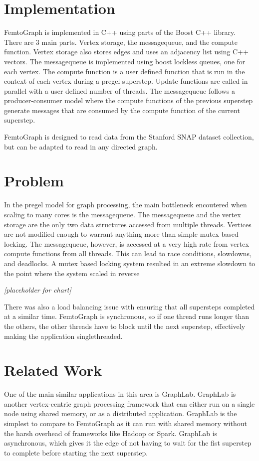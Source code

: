 \documentclass{sig-alternate-05-2015}
\begin{document}
\section{Implementation}
FemtoGraph is implemented in C++ using parts of the Boost C++ library. There are 3 main parts. Vertex storage, the messagequeue, and the compute function. Vertex storage also stores edges and uses  an adjacency list using C++ vectors. The messagequeue is implemented using boost lockless queues, one for each vertex. The compute function is a user defined function that is run in the context of each vertex during a pregel superstep. Update functions are called in parallel with a user defined number of threads. The messagequeue follows a producer-consumer model where the compute functions of the previous superstep generate messages that are consumed by the compute function of the current superstep.

FemtoGraph is designed to read data from the Stanford SNAP dataset collection, but can be adapted to read in any directed graph. 


\section{Problem}
In the pregel model for graph processing, the main bottleneck encoutered when scaling to many cores is the messagequeue. The messagequeue and the vertex storage are the only two data structures accessed from multiple threads. Vertices are not modified enough to warrant anything more than simple mutex based locking. The messagequeue, however, is accessed at a very high rate from vertex compute functions from all threads. This can lead to race conditions, slowdowns, and deadlocks. A mutex based locking system resulted in an extreme slowdown to the point where the system scaled in reverse

\textit{[placeholder for chart]}

There was also a load balancing issue with ensuring that all supersteps completed at a similar time. FemtoGraph is synchronous, so if one thread runs longer than the others, the other threads have to block until the next superstep, effectively making the application singlethreaded.  

\section{Related Work}
One of the main similar applications in this area is GraphLab. GraphLab is another vertex-centric graph processing framework that can either run on a single node using shared memory, or as a distributed application. GraphLab is the simplest to compare to FemtoGraph as it can run with shared memory without the harsh overhead of frameworks like Hadoop or Spark. GraphLab is asynchronous, which gives it the edge of not having to wait for the fist superstep to complete before starting the next superstep. 
\end{document}
